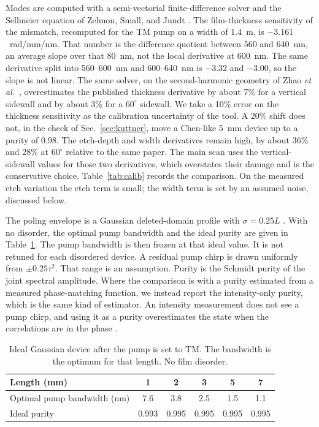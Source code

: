 \documentclass[11pt,a4paper]{article}
\begin{document}
Modes are computed with a semi-vectorial finite-difference solver and the Sellmeier equation of Zelmon, Small, and Jundt \cite{Zelmon1997}.
The film-thickness sensitivity of the mismatch, recomputed for the TM pump on a width of 1.4~\textmu m, is $-3.161$~rad/mm/nm.
That number is the difference quotient between 560 and 640~nm, an average slope over that 80~nm, not the local derivative at 600~nm.
The same derivative split into 560--600~nm and 600--640~nm is $-3.32$ and $-3.00$, so the slope is not linear.
The same solver, on the second-harmonic geometry of Zhao \emph{et al.}\ \cite{ZhaoLu2023}, overestimates the published thickness derivative by about 7\% for a vertical sidewall and by about 3\% for a $60^{\circ}$ sidewall.
We take a 10\% error on the thickness sensitivity as the calibration uncertainty of the tool.
A 20\% shift does not, in the check of Sec.~\ref{sec:kuttner}, move a Chen-like 5~mm device up to a purity of 0.98.
The etch-depth and width derivatives remain high, by about 36\% and 28\% at $60^{\circ}$ relative to the same paper.
The main scan uses the vertical-sidewall values for those two derivatives, which overstates their damage and is the conservative choice.
Table~\ref{tab:calib} records the comparison.
On the measured etch variation the etch term is small; the width term is set by an assumed noise, discussed below.

The poling envelope is a Gaussian deleted-domain profile with $\sigma=0.25L$ \cite{Tambasco2016}.
With no disorder, the optimal pump bandwidth and the ideal purity are given in Table~\ref{tab:ideal}.
The pump bandwidth is then frozen at that ideal value.
It is not retuned for each disordered device.
A residual pump chirp is drawn uniformly from $\pm 0.25\tau^{2}$.
That range is an assumption.
Purity is the Schmidt purity of the joint spectral amplitude.
Where the comparison is with a purity estimated from a measured phase-matching function, we instead report the intensity-only purity, which is the same kind of estimator.
An intensity measurement does not see a pump chirp, and using it as a purity overestimates the state when the correlations are in the phase \cite{Graffitti2018}.

\begin{table}[t]
\centering
\caption{Ideal Gaussian device after the pump is set to TM.
The bandwidth is the optimum for that length.
No film disorder.}
\label{tab:ideal}
\begin{tabular}{lccccc}
\toprule
Length (mm) & 1 & 2 & 3 & 5 & 7 \\
\midrule
Optimal pump bandwidth (nm) & 7.6 & 3.8 & 2.5 & 1.5 & 1.1 \\
Ideal purity & 0.993 & 0.995 & 0.995 & 0.995 & 0.995 \\
\bottomrule
\end{tabular}
\end{table}
\end{document}
